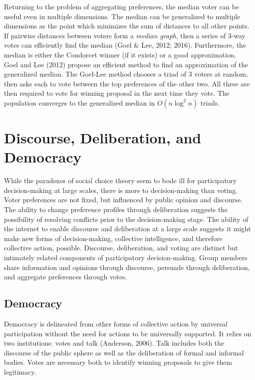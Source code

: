 Returning to the problem of aggregating preferences, the median voter can be useful even in multiple dimensions. The median can be generalized to multiple dimensions as the point which minimizes the sum of distances to all other points. If pairwise distances between voters form a {\em median graph}, then a series of 3-way votes can efficiently find the median (Goel \& Lee, 2012; 2016). Furthermore, the median is either the Condorcet winner (if it exists) or a good approximation. Goel and Lee (2012) propose an efficient method to find an approximation of the generalized median. The Goel-Lee method chooses a triad of 3 voters at random, then asks each to vote between the top preferences of the other two. All three are then required to vote for winning proposal in the next time they vote. The population converges to the generalized median in $O(n \log^2 n)$ triads.

\section{Discourse, Deliberation, and Democracy}
While the paradoxes of social choice theory seem to bode ill for participatory decision-making at large scales, there is more to decision-making than voting. Voter preferences are not fixed, but influenced by public opinion and discourse. The ability to change preference profiles through deliberation suggests the possibility of resolving conflicts prior to the decision-making stage. The ability of the internet to enable discourse and deliberation at a large scale suggests it might make new forms of decision-making, collective intelligence, and therefore collective action, possible. Discourse, deliberation, and voting are distinct but intimately related components of participatory decision-making. Group members share information and opinions through discourse, persuade through deliberation, and aggregate preferences through votes.

\subsection{Democracy}
Democracy is delineated from other forms of collective action by universal participation without the need for actions to be universally supported. It relies on two institutions: votes and talk (Anderson, 2006). Talk includes both the discourse of the public sphere as well as the deliberation of formal and informal bodies. Votes are necessary both to identify winning proposals to give them legitimacy.

